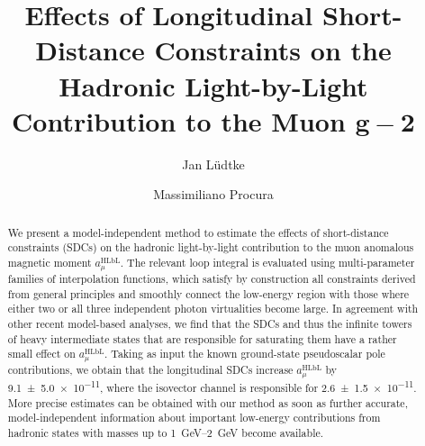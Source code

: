 \documentclass[pdftex,twocolumn,epjc3]{svjour3}          %
\begin{document}
\title{Effects of Longitudinal Short-Distance Constraints on the Hadronic Light-by-Light Contribution to the Muon $\mathbf{g-2}$}


\author{Jan L\"udtke
        \and
        Massimiliano Procura
}



\date{\vspace*{-2cm}}


\maketitle
\sloppy
\begin{abstract}
We present a model-independent method to estimate the effects of short-distance constraints (SDCs) on the hadronic light-by-light contribution to the muon anomalous magnetic moment $a_\mu^\text{HLbL}$. The relevant loop integral is evaluated using multi-parameter families of interpolation functions, which  satisfy by construction all constraints derived from general principles and smoothly connect the low-energy region with those where either two or all three independent photon virtualities become large. In agreement with other recent model-based analyses, we find that the SDCs and thus the infinite towers of heavy intermediate states that are responsible for saturating them have a rather small effect on $a_\mu^\text{HLbL}$. Taking as input the known ground-state pseudoscalar pole contributions, we obtain that the longitudinal SDCs increase $a_\mu^\text{HLbL}$ by  \num[separate-uncertainty]{9.1\pm5.0e-11}, where the isovector channel is responsible for \num[separate-uncertainty]{2.6\pm1.5e-11}. More precise estimates can be obtained with our method as soon as further accurate, model-independent information about  important low-energy contributions from hadronic states with masses up to \SIrange[range-units=single, range-phrase=--]{1}{2}{\GeV} become available.
\end{abstract}








\begin{acknowledgements}

\end{acknowledgements}


\appendix





\end{document}
